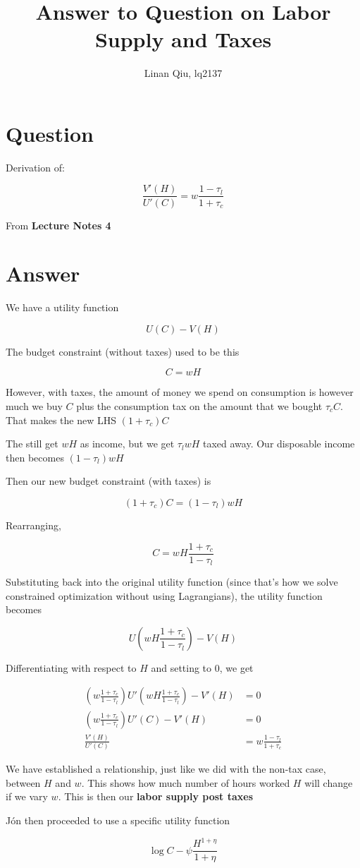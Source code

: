 \documentclass[11pt]{scrartcl}
\title{Answer to Question on Labor Supply and Taxes}
\author{Linan Qiu, lq2137}
\newcommand{\jon}{Jón }
\begin{document}
\maketitle

\section{Question}

Derivation of:

\[\frac{V'(H)}{U'(C)} = w \frac{1- \tau_l}{1+\tau_c}\] 

From \textbf{Lecture Notes 4}

\section{Answer}

We have a utility function

\[U(C) - V(H)\]

The budget constraint (without taxes) used to be this

\[C = wH\]

However, with taxes, the amount of money we spend on consumption is however much we buy $C$ plus the consumption tax on the amount that we bought $\tau_c C$. That makes the new LHS $(1+\tau_c)C$

The still get $wH$ as income, but we get $\tau_l wH$ taxed away. Our disposable income then becomes $(1-\tau_l)wH$ 

Then our new budget constraint (with taxes) is

\[(1+\tau_c)C = (1-\tau_l)wH\]

Rearranging,

\[ C = wH \frac{1+\tau_c}{1-\tau_l} \]

Substituting back into the original utility function (since that's how we solve constrained optimization without using Lagrangians), the utility function becomes

\[ U \left( wH \frac{1+\tau_c}{1-\tau_l} \right) - V(H) \]

Differentiating with respect to $H$ and setting to $0$, we get

\begin{align*}
\left(w\frac{1+\tau_c}{1-\tau_l}\right) U' \left( wH \frac{1+\tau_c}{1-\tau_l} \right) - V'(H) &= 0 \\
\left(w\frac{1+\tau_c}{1-\tau_l} \right) U' (C) - V'(H) &= 0 \\
\frac{V'(H)}{U'(C)} &= w\frac{1-\tau_l}{1+\tau_c}
\end{align*}

We have established a relationship, just like we did with the non-tax case, between $H$ and $w$. This shows how much number of hours worked $H$ will change if we vary $w$. This is then our \textbf{labor supply post taxes}

\jon then proceeded to use a specific utility function

\[\log{C} - \psi \frac{H^{1+\eta}}{1+\eta} \]
\end{document}
